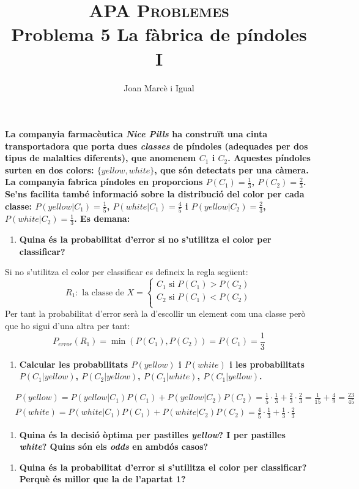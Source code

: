 \documentclass[a4paper]{article}
\title{\textsc{APA Problemes} \\ Problema 5 La fàbrica de píndoles I}
\author{Joan Marcè i Igual}
\date{}
\begin{document}
\maketitle

\textbf{La companyia farmacèutica \emph{Nice Pills} ha construït una cinta transportadora que porta dues \emph{classes} de píndoles (adequades per dos tipus de malalties diferents), que anomenem $C_1$ i $C_2$. Aquestes píndoles surten en dos colors: $\{yellow, white\}$, que són detectats per una càmera. La companyia fabrica píndoles en proporcions $P(C_1) = \frac{1}{3}$, $P(C_2) = \frac{2}{3}$. Se'ns facilita també informació sobre la distribució del color per cada classe: $P(yellow|C_1) = \frac{1}{5}$, $P(white|C_1) = \frac{4}{5}$ i $P(yellow|C_2)=\frac{2}{3}$, $P(white|C_2)=\frac{1}{3}$. Es demana:}


\begin{enumerate}
	\item \textbf{Quina és la probabilitat d'error si no s'utilitza el color per classificar?}
\end{enumerate}
Si no s'utilitza el color per classificar es defineix la regla següent:
$$
R_1: \text{ la classe de } X = 
\begin{cases}
C_1 \text{ si } P(C_1) > P(C_2) \\
C_2 \text{ si } P(C_1) < P(C_2) \\
\end{cases}
$$
Per tant la probabilitat d'error serà la d'escollir un element com una classe però que ho sigui d'una altra per tant:
$$
P_{error}(R_1) = \min(P(C_1),P(C_2)) = P(C_1) = \boxed{\frac{1}{3}}
$$

\begin{enumerate}[resume]
	\item \textbf{Calcular les probabilitats $P(yellow)$ i $P(white)$ i les probabilitats $P(C_1|yellow)$, $P(C_2|yellow)$, $P(C_1|white)$, $P(C_1|yellow)$.}
\end{enumerate}
\begin{align*}
&P(yellow) = P(yellow|C_1)P(C_1) + P(yellow|C_2)P(C_2) = 
\frac{1}{5}·\frac{1}{3} + \frac{2}{3}·\frac{2}{3} = 
\frac{1}{15} + \frac{4}{9} = \boxed{\frac{23}{45}} \\
&P(white) = P(white|C_1)P(C_1) + P(white|C_2)P(C_2) =
\frac{4}{5}·\frac{1}{3} + \frac{1}{3}·\frac{2}{3}
\end{align*}


\begin{enumerate}[resume]
	\item \textbf{Quina és la decisió òptima per pastilles \emph{yellow}? I per pastilles \emph{white}? Quins són els \emph{odds} en ambdós casos?}
\end{enumerate}

\begin{enumerate}[resume]
	\item \textbf{Quina és la probabilitat d'error si s'utilitza el color per classificar? Perquè és millor que la de l'apartat 1?}
\end{enumerate}
\end{document}
